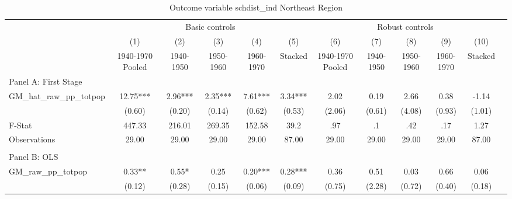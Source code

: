 \begin{table}[htbp]\centering {} \begin{threeparttable} \caption{Outcome variable schdist\_ind Northeast Region} \begin{tabular}{l*{11}{c}} \toprule
          &\multicolumn{5}{c}{Basic controls}                                   &\multicolumn{5}{c}{Robust controls}                                  \\\cmidrule(lr){2-6}\cmidrule(lr){7-11}
          &\multicolumn{1}{c}{(1)}&\multicolumn{1}{c}{(2)}&\multicolumn{1}{c}{(3)}&\multicolumn{1}{c}{(4)}&\multicolumn{1}{c}{(5)}&\multicolumn{1}{c}{(6)}&\multicolumn{1}{c}{(7)}&\multicolumn{1}{c}{(8)}&\multicolumn{1}{c}{(9)}&\multicolumn{1}{c}{(10)}\\
          &\multicolumn{1}{c}{1940-1970 Pooled}&\multicolumn{1}{c}{1940-1950}&\multicolumn{1}{c}{1950-1960}&\multicolumn{1}{c}{1960-1970}&\multicolumn{1}{c}{Stacked}&\multicolumn{1}{c}{1940-1970 Pooled}&\multicolumn{1}{c}{1940-1950}&\multicolumn{1}{c}{1950-1960}&\multicolumn{1}{c}{1960-1970}&\multicolumn{1}{c}{Stacked}\\
\cmidrule(lr){1-11}
\multicolumn{10}{l}{Panel A: First Stage}\\
\cmidrule(lr){1-11}
GM\_hat\_raw\_pp\_totpop&     12.75***&      2.96***&      2.35***&      7.61***&      3.34***&      2.02   &      0.19   &      2.66   &      0.38   &     -1.14   \\
          &    (0.60)   &    (0.20)   &    (0.14)   &    (0.62)   &    (0.53)   &    (2.06)   &    (0.61)   &    (4.08)   &    (0.93)   &    (1.01)   \\
\midrule
F-Stat    &    447.33   &    216.01   &    269.35   &    152.58   &      39.2   &       .97   &        .1   &       .42   &       .17   &      1.27   \\
Observations&     29.00   &     29.00   &     29.00   &     29.00   &     87.00   &     29.00   &     29.00   &     29.00   &     29.00   &     87.00   \\
\cmidrule[\heavyrulewidth](lr){1-11} \\ \cmidrule[\heavyrulewidth](lr){1-11}
\multicolumn{10}{l}{Panel B: OLS}\\
\cmidrule(lr){1-11}
GM\_raw\_pp\_totpop&      0.33** &      0.55*  &      0.25   &      0.20***&      0.28***&      0.36   &      0.51   &      0.03   &      0.66   &      0.06   \\
          &    (0.12)   &    (0.28)   &    (0.15)   &    (0.06)   &    (0.09)   &    (0.75)   &    (2.28)   &    (0.72)   &    (0.40)   &    (0.18)   \\

\end{tabular}
\end{threeparttable}
\end{table}
